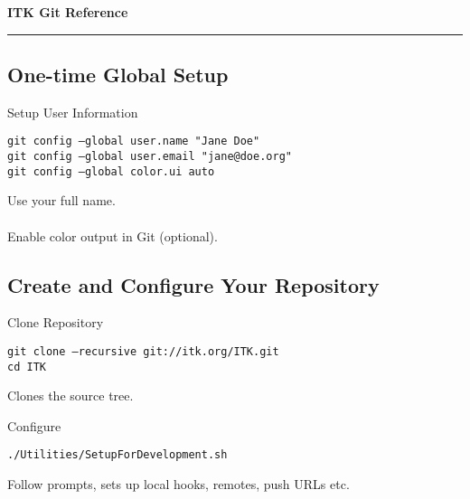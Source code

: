 \documentclass[10pt]{article}
\newlength{\cvsep}
\newlength{\cvtitles}
\newlength{\cvmain}
\newenvironment{category}[1]
  {\parbox[t]{\cvtitles}{\large\sc\centering #1}\hspace*{\cvsep}\begin{minipage}[t]{\cvmain}}
  {\end{minipage}\vspace*{0.35cm}}
\begin{document}
\pagestyle{empty}

{\centering
  \huge \bf ITK Git Reference
  \vspace*{0.1cm}
  \hrule
}
\vspace*{0.3cm}

\subsection*{One-time Global Setup}
\begin{category}{Setup User Information}
\parbox[t]{0.6\cvmain}{%
\texttt{git config --global user.name "Jane Doe"\\
git config --global user.email "jane@doe.org"\\
git config --global color.ui auto}}
\parbox[t]{0.38\cvmain}{%
Use your full name.\\
\\
Enable color output in Git (optional).
}
\end{category}

\subsection*{Create and Configure Your Repository}
\begin{category}{Clone Repository}
\parbox[t]{0.6\cvmain}{%
  \texttt{git clone --recursive git://itk.org/ITK.git\\ cd ITK}
}
\parbox[t]{0.38\cvmain}{%
Clones the source tree.
}
\end{category}
\begin{category}{Configure}
\parbox[t]{0.6\cvmain}{%
  \texttt{./Utilities/SetupForDevelopment.sh}
}
\parbox[t]{0.38\cvmain}{%
Follow prompts, sets up local hooks, remotes, push URLs etc.
}
\end{category}
\end{document}
